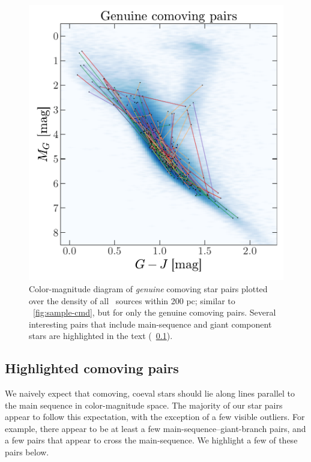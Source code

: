 \documentclass[modern, letterpaper]{aastex61}
\newcommand{\tgas}{\acronym{TGAS}}
\begin{document}
\begin{figure}[htbp]
  \begin{center}
    \includegraphics[width=\linewidth]{genuine_cmd.pdf}
  \end{center}
  \caption{%
    Color-magnitude diagram of \emph{genuine} comoving star pairs plotted over
    the density of all \tgas\ sources within 200 pc; similar to
    \figurename~\ref{fig:sample-cmd}, but for only the genuine comoving
    pairs.
    Several interesting pairs that include main-sequence and giant component
    stars are highlighted in the text
    (\sectionname~\ref{sec:interesting-pairs}).
    \label{fig:genuine-cmd}}
\end{figure}

\subsection{Highlighted comoving pairs}\label{sec:interesting-pairs}

We naively expect that comoving, coeval stars should lie along lines parallel to
the main sequence in color-magnitude space. The majority of our star pairs
appear to follow this expectation, with the exception of a few visible outliers.
For example, there appear to be at least a few main-sequence--giant-branch
pairs, and a few pairs that appear to cross the main-sequence.
We highlight a few of these pairs below.
\end{document}
